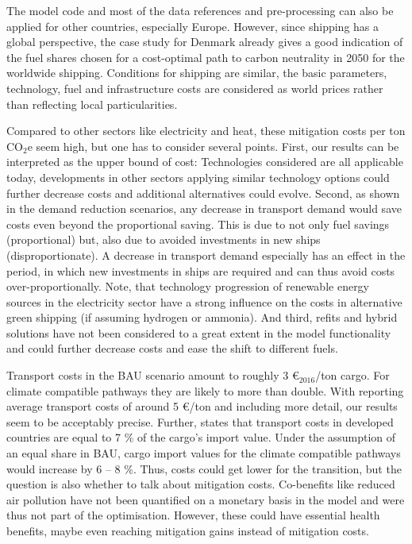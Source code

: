 \documentclass[article]{elsarticle}
\begin{document}
The model code and most of the data references and pre-processing can also be applied for other countries, especially Europe. However, since shipping has a global perspective, the case study for Denmark already gives a good indication of the fuel shares chosen for a cost-optimal path to carbon neutrality in 2050 for the worldwide shipping. Conditions for shipping are similar, the basic parameters, technology, fuel and infrastructure costs are considered as world prices rather than reflecting local particularities. 

Compared to other sectors like electricity and heat, these mitigation costs per ton CO$_2$e seem high, but one has to consider several points. First, our results can be interpreted as the upper bound of cost: Technologies considered are all applicable today, developments in other sectors applying similar technology options could further decrease costs and additional alternatives could evolve. Second, as shown in the demand reduction scenarios, any decrease in transport demand would save costs even beyond the proportional saving. This is due to not only fuel savings (proportional) but, also due to avoided investments in new ships (disproportionate). A decrease in transport demand especially has an effect in the period, in which new investments in ships are required and can thus avoid costs over-proportionally. Note, that technology progression of renewable energy sources in the electricity sector have a strong influence on the costs in alternative green shipping (if assuming hydrogen or ammonia). And third, refits and hybrid solutions have not been considered to a great extent in the model functionality and could further decrease costs and ease the shift to different fuels.

Transport costs in the BAU scenario amount to roughly 3 \euro$_{2016}$/ton cargo. For climate compatible pathways they are likely to more than double. With \citet[p.~50]{UNCTAD2015} reporting average transport costs of around 5 \euro/ton and including more detail, our results seem to be acceptably precise. Further, \cite[p.~55]{UNCTAD2015} states that transport costs in developed countries are equal to 7 \% of the cargo's import value. Under the assumption of an equal share in BAU, cargo import values for the climate compatible pathways would increase by 6 -- 8 \%.
Thus, costs could get lower for the transition, but the question is also whether to talk about mitigation costs. Co-benefits like reduced air pollution have not been quantified on a monetary basis in the model and were thus not part of the optimisation. However, these could have essential health benefits, maybe even reaching mitigation gains instead of mitigation costs.
\end{document}
